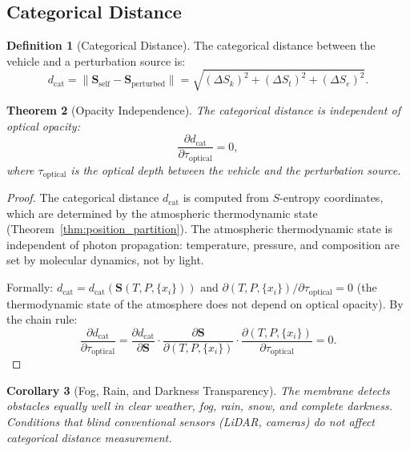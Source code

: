 \documentclass[twocolumn,10pt]{article}
\newtheorem{theorem}{Theorem}[section]
\newtheorem{corollary}[theorem]{Corollary}
\theoremstyle{definition}
\newtheorem{definition}[theorem]{Definition}
\theoremstyle{remark}
\newcommand{\Sk}{S_k}
\newcommand{\St}{S_t}
\newcommand{\Se}{S_e}
\newcommand{\dcat}{d_{\mathrm{cat}}}
\begin{document}
\subsection{Categorical Distance}

\begin{definition}[Categorical Distance]
\label{def:cat_distance}
The categorical distance between the vehicle and a perturbation source is:
\begin{equation}
  \dcat = \|\mathbf{S}_{\mathrm{self}} - \mathbf{S}_{\mathrm{perturbed}}\| = \sqrt{(\Delta\Sk)^2 + (\Delta\St)^2 + (\Delta\Se)^2}.
  \label{eq:cat_distance}
\end{equation}
\end{definition}

\begin{theorem}[Opacity Independence]
\label{thm:opacity}
The categorical distance is independent of optical opacity:
\begin{equation}
  \frac{\partial \dcat}{\partial \tau_{\mathrm{optical}}} = 0,
  \label{eq:opacity_independence}
\end{equation}
where $\tau_{\mathrm{optical}}$ is the optical depth between the vehicle and the perturbation source.
\end{theorem}

\begin{proof}
The categorical distance $\dcat$ is computed from $S$-entropy coordinates, which are determined by the atmospheric thermodynamic state (Theorem~\ref{thm:position_partition}). The atmospheric thermodynamic state is independent of photon propagation: temperature, pressure, and composition are set by molecular dynamics, not by light.

Formally: $\dcat = \dcat(\mathbf{S}(T, P, \{x_i\}))$ and $\partial(T, P, \{x_i\})/\partial\tau_{\mathrm{optical}} = 0$ (the thermodynamic state of the atmosphere does not depend on optical opacity). By the chain rule:
\begin{equation}
  \frac{\partial \dcat}{\partial \tau_{\mathrm{optical}}} = \frac{\partial \dcat}{\partial \mathbf{S}} \cdot \frac{\partial \mathbf{S}}{\partial(T,P,\{x_i\})} \cdot \frac{\partial(T,P,\{x_i\})}{\partial\tau_{\mathrm{optical}}} = 0.
  \label{eq:opacity_proof}
\end{equation}
\end{proof}

\begin{corollary}[Fog, Rain, and Darkness Transparency]
\label{cor:weather_transparency}
The membrane detects obstacles equally well in clear weather, fog, rain, snow, and complete darkness. Conditions that blind conventional sensors (LiDAR, cameras) do not affect categorical distance measurement.
\end{corollary}
\end{document}

